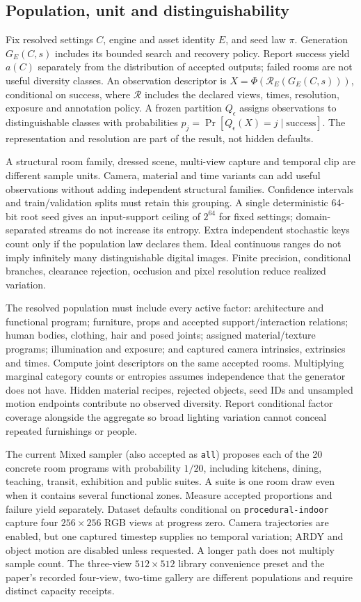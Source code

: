 \documentclass{article}
\begin{document}
\subsection{Population, unit and distinguishability}
Fix resolved settings $C$, engine and asset identity $E$, and seed law $\pi$.
Generation $G_E(C,s)$ includes its bounded search and recovery policy. Report
success yield $a(C)$ separately from the distribution of accepted outputs;
failed rooms are not useful diversity classes. An observation descriptor is
$X=\Phi(\mathcal R_E(G_E(C,s)))$, conditional on success, where $\mathcal R$
includes the declared views, times, resolution, exposure and annotation policy.
A frozen partition $Q_\epsilon$ assigns observations to distinguishable classes
with probabilities $p_j=\Pr[Q_\epsilon(X)=j\mid\mathrm{success}]$.
The representation and resolution are part of the result, not hidden defaults.

A structural room family, dressed scene, multi-view capture and temporal clip
are different sample units. Camera, material and time variants can add useful
observations without adding independent structural families. Confidence intervals
and train/validation splits must retain this grouping. A single deterministic
64-bit root seed gives an input-support ceiling of $2^{64}$ for fixed settings;
domain-separated streams do not increase its entropy. Extra independent stochastic
keys count only if the population law declares them. Ideal continuous ranges do
not imply infinitely many distinguishable digital images. Finite precision,
conditional branches, clearance rejection, occlusion and pixel resolution reduce
realized variation.

The resolved population must include every active factor: architecture and
functional program; furniture, props and accepted support/interaction relations;
human bodies, clothing, hair and posed joints; assigned material/texture programs;
illumination and exposure; and captured camera intrinsics, extrinsics and times.
Compute joint descriptors on the same accepted rooms. Multiplying marginal
category counts or entropies assumes independence that the generator does not
have. Hidden material recipes, rejected objects, seed IDs and unsampled motion
endpoints contribute no observed diversity. Report conditional factor coverage
alongside the aggregate so broad lighting variation cannot conceal repeated
furnishings or people.

The current Mixed sampler (also accepted as \texttt{all}) proposes each of the
20 concrete room programs with probability $1/20$, including kitchens, dining,
teaching, transit, exhibition and public suites. A suite is one room draw even
when it contains several functional zones. Measure accepted proportions and
failure yield separately. Dataset defaults conditional on
\texttt{procedural-indoor} capture four $256\times256$ RGB views at progress zero.
Camera trajectories are enabled, but one captured timestep supplies no temporal
variation; ARDY and object motion are disabled unless requested. A longer path
does not multiply sample count. The three-view $512\times512$ library convenience
preset and the paper's recorded four-view, two-time gallery are different
populations and require distinct capacity receipts.
\end{document}
